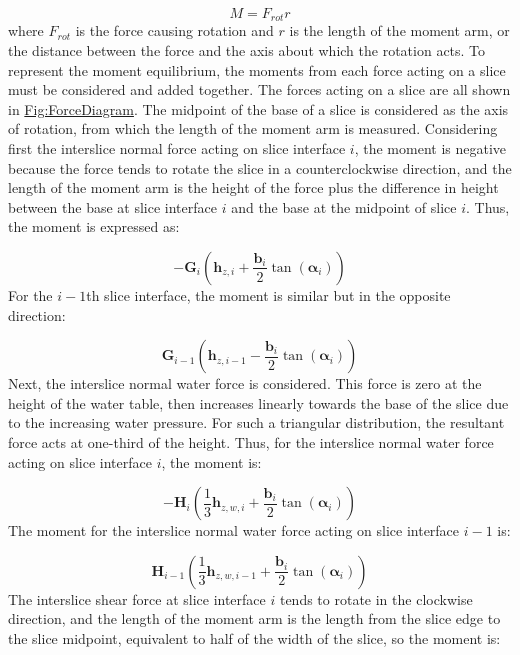 \documentclass[12pt]{article}
\begin{document}
\begin{displaymath}
M={F_{rot}} r
\end{displaymath}
where ${F_{rot}}$ is the force causing rotation and $r$ is the length of the moment arm, or the distance between the force and the axis about which the rotation acts. To represent the moment equilibrium, the moments from each force acting on a slice must be considered and added together. The forces acting on a slice are all shown in \hyperref[Figure:ForceDiagram]{Fig:ForceDiagram}. The midpoint of the base of a slice is considered as the axis of rotation, from which the length of the moment arm is measured. Considering first the interslice normal force acting on slice interface $i$, the moment is negative because the force tends to rotate the slice in a counterclockwise direction, and the length of the moment arm is the height of the force plus the difference in height between the base at slice interface $i$ and the base at the midpoint of slice $i$. Thus, the moment is expressed as:

\begin{displaymath}
-{\mathbf{G}}_{i} \left({\mathbf{h}_{z,i}}+\frac{{\mathbf{b}}_{i}}{2} \tan\left({\mathbf{α}}_{i}\right)\right)
\end{displaymath}
For the $i-1$th slice interface, the moment is similar but in the opposite direction:

\begin{displaymath}
{\mathbf{G}}_{i-1} \left({\mathbf{h}_{z,i-1}}-\frac{{\mathbf{b}}_{i}}{2} \tan\left({\mathbf{α}}_{i}\right)\right)
\end{displaymath}
Next, the interslice normal water force is considered. This force is zero at the height of the water table, then increases linearly towards the base of the slice due to the increasing water pressure. For such a triangular distribution, the resultant force acts at one-third of the height. Thus, for the interslice normal water force acting on slice interface $i$, the moment is:

\begin{displaymath}
-{\mathbf{H}}_{i} \left(\frac{1}{3} {\mathbf{h}_{z,w,i}}+\frac{{\mathbf{b}}_{i}}{2} \tan\left({\mathbf{α}}_{i}\right)\right)
\end{displaymath}
The moment for the interslice normal water force acting on slice interface $i-1$ is:

\begin{displaymath}
{\mathbf{H}}_{i-1} \left(\frac{1}{3} {\mathbf{h}_{z,w,i-1}}+\frac{{\mathbf{b}}_{i}}{2} \tan\left({\mathbf{α}}_{i}\right)\right)
\end{displaymath}
The interslice shear force at slice interface $i$ tends to rotate in the clockwise direction, and the length of the moment arm is the length from the slice edge to the slice midpoint, equivalent to half of the width of the slice, so the moment is:
\end{document}
